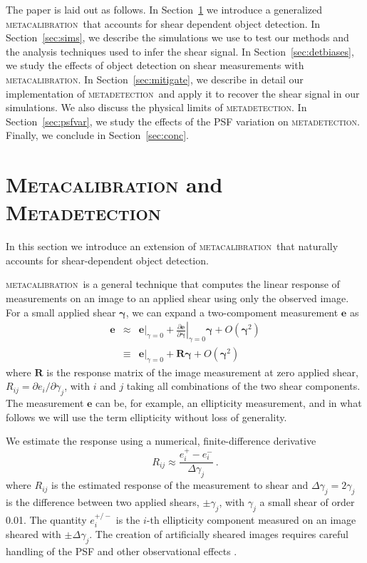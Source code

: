 \documentclass[iop, twocolappendix, appendixfloats, numberedappendix, apj]{hackemulateapj}
\newcommand{\mcal}{\textsc{metacalibration}}
\newcommand{\mdet}{\textsc{metadetection}}
\begin{document}
The paper is laid out as follows. In Section~\ref{sec:mdet} we introduce a
generalized \mcal\ that accounts for shear dependent object detection.  In
Section~\ref{sec:sims}, we describe the simulations we use to test our methods
and the analysis techniques used to infer the shear signal. In
Section~\ref{sec:detbiases}, we study the effects of object detection on shear
measurements with \mcal.  In Section~\ref{sec:mitigate}, we describe in detail 
our implementation of \mdet\ and apply it to recover the shear signal
in our simulations. We also discuss the physical limits of
\mdet.  In Section~\ref{sec:psfvar}, we study the effects of the PSF
variation on \mdet.  Finally, we conclude in Section~\ref{sec:conc}.

\section{\textsc{Metacalibration} and \textsc{Metadetection}}
\label{sec:mdet}

In this section we introduce an extension of \mcal\ that naturally accounts for
shear-dependent object detection.

\mcal\ is a general technique that computes the linear response of measurements
on an image to an applied shear using only the observed image.  For a small
applied shear $\boldsymbol{\gamma}$, we can expand a two-compoment
measurement $\boldsymbol{e}$ as
\begin{eqnarray}
\boldsymbol{e} & \approx & \left.\boldsymbol{e}\right|_{\gamma=0} +
                           \left.\frac{\partial \boldsymbol{e}}{\partial\boldsymbol\gamma}\right|_{\gamma=0} \boldsymbol\gamma +
                           O(\boldsymbol\gamma^2)\nonumber\\
               & \equiv  & \left.\boldsymbol{e}\right|_{\gamma=0} +
                           \boldsymbol{R} \boldsymbol\gamma +
                           O(\boldsymbol\gamma^2)
\end{eqnarray}
where $\boldsymbol{R}$ is the response matrix of the image measurement
at zero applied shear, $R_{ij}=\partial e_i /\partial \gamma_j$, with $i$ and
$j$ taking all combinations of the two shear components.  The measurement
$\boldsymbol{e}$ can be, for example,  an ellipticity measurement, and in what
follows we will use the term ellipticity without loss of generality.

We estimate the response using a numerical, finite-difference derivative
\begin{equation}
R_{ij} \approx \frac{e_i^{+} - e_i^{-}}{\Delta\gamma_j}\ .
\end{equation}
where $R_{ij}$ is the estimated response of the measurement to shear and
$\Delta\gamma_j = 2 \gamma_j$ is the difference between two applied shears,
$\pm \gamma_j$, with $\gamma_j$ a small shear of order 0.01. The quantity
$e_i^{+/-}$ is the $i$-th ellipticity component measured on an image sheared
with $\pm\Delta\gamma_j$.  The creation of artificially sheared images requires
careful handling of the PSF and other observational effects
\citep{SheldonMcal2017}.
\end{document}
